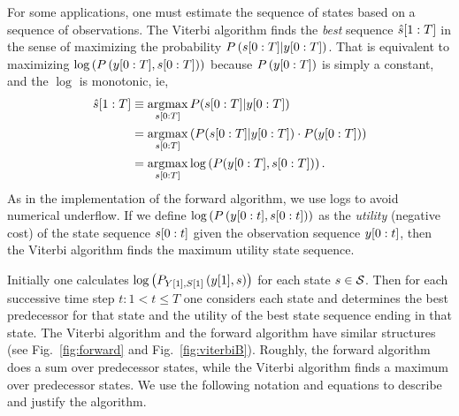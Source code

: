 For some applications, one must estimate the sequence of states based
on a sequence of observations.  The Viterbi algorithm %
%
finds the \emph{best} sequence $\hat s[1:T]$ in the sense of
maximizing the probability $P\left( s[0:T]|y[0:T]
\right)$.  That is equivalent to maximizing $\log \left( P\left(
    y[0:T],s[0:T] \right) \right)$ because $P \left(
  y[0:T] \right)$ is simply a constant, and the $\log$ is
monotonic, ie,
\begin{align*}
  \hat s[1:T] &\equiv \operatorname*{argmax}_{s[0:T]}
  P(s[0:T]|y[0:T])\\
  &= \operatorname*{argmax}_{s[0:T]} \left( P(s[0:T]|y[0:T]) \cdot
    P(y[0:T]) \right)\\
  &= \operatorname*{argmax}_{s[0:T]} \log \left( P(y[0:T],s[0:T])
  \right).
\end{align*}
As in the implementation of the forward algorithm, we use logs to
avoid numerical underflow.  If we define $\log \left( P\left(
    y[0:t], s[0:t] \right) \right)$ as the
\emph{utility} (negative cost) of the state sequence $s[0:t]$
given the observation sequence $y[0:t]$, then the Viterbi
algorithm finds the maximum utility state sequence.

Initially one calculates
$\log\left(P_{{Y}{[1]},{S}{[1]}} \left({y}{[1]}, s \right) \right)$
for each state $s \in \states$.  Then for each successive time step
$t: 1 < t \leq T$ one considers each state and determines the best
predecessor for that state and the utility of the best state sequence
ending in that state.  The Viterbi algorithm and the forward algorithm
have similar structures (see Fig.~\ref{fig:forward} and
Fig.~\ref{fig:viterbiB}).  Roughly, the forward algorithm does a sum
over predecessor states, while the Viterbi algorithm finds a maximum
over predecessor states. We use the following notation and equations
to describe and justify the algorithm.

